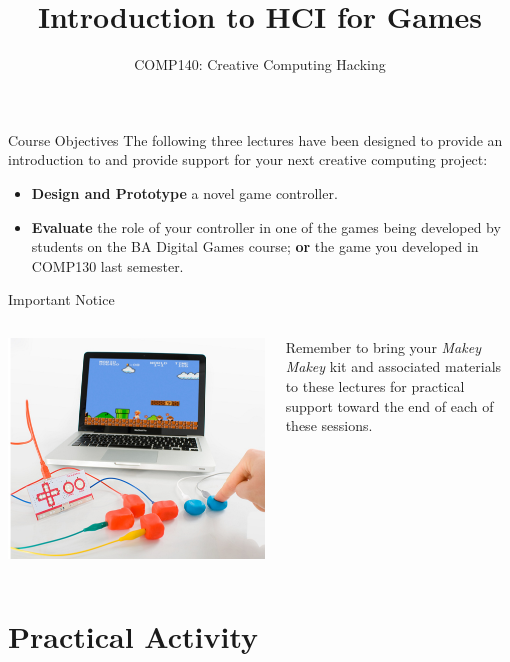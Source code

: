 \documentclass[xcolor={dvipsnames}]{beamer}\usepackage{etoolbox}\newtoggle{printable}\togglefalse{printable}
\begin{document}
\title{Introduction to HCI for Games}   
\subtitle{COMP140: Creative Computing Hacking}

\frame{\titlepage} 

\begin{frame}{Course Objectives}
	The following three lectures have been designed to provide an introduction to and provide support for your next creative computing project:
	
	\begin{itemize}
		\item \textbf{Design and Prototype} a novel game controller.
		\item \textbf{Evaluate} the role of your controller in one of the games being developed by students on the BA Digital Games course; \textbf{or}
                      the game you developed in COMP130 last semester.
	\end{itemize}
\end{frame}

\begin{frame}{Important Notice}
	\begin{columns}[onlytextwidth]
		\begin{column}{0.45\textwidth}
			\includegraphics[height=22ex]{MakeyMakey.jpg}
		\end{column}
		\begin{column}{0.45\textwidth}
			Remember to bring your \textit{Makey Makey} kit and associated materials to these lectures for practical 
			support toward the end of each of these sessions.
		\end{column}
	\end{columns}
\end{frame}





%

%

\part{Practical Activity}
\frame{\partpage}
\end{document}
